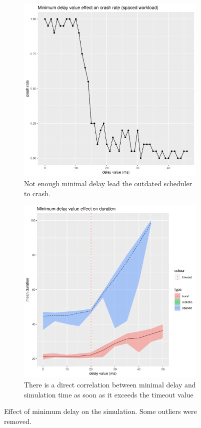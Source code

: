 \documentclass[12pt, a4paper]{memoir}
\begin{document}
\begin{figure}[h]
	\begin{subfigure}{.5\textwidth}
		\centering
		\includegraphics[width=\linewidth]{imgs/min-delay_spaced_200_delay170_crash_old.png}
		\caption{Not enough minimal delay lead the outdated scheduler to crash.}
		\label{fig:min-delay_crash}
	\end{subfigure}
	\begin{subfigure}{.5\textwidth}
		\centering
		\includegraphics[width=\linewidth]{imgs/min-delay_duration.png}
		\caption{There is a direct correlation between minimal delay and simulation time as soon as it exceeds the timeout value}
		\label{fig:min-delay_duration}
	\end{subfigure}
	\caption{Effect of minimum delay on the simulation. Some outliers were
	removed.}
	\label{fig:min-delay_old}
\end{figure}
\end{document}
